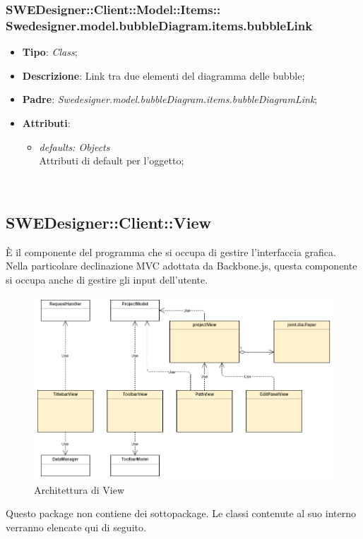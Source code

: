 \documentclass[../DefinizioneDiProdotto.tex]{subfiles}
\begin{document}
			\subsubsection[Swedesigner.model.bubbleDiagram.items.bubbleLink]{SWEDesigner::Client::Model::Items::\\Swedesigner.model.bubbleDiagram.items.bubbleLink}
			\hypertarget{SWEDesigner::Client::Model::Items::Swedesigner.model.bubbleDiagram.items.bubbleLink}{}
			\begin{itemize}
				\item \textbf{Tipo}: \emph{Class};
				\item \textbf{Descrizione}: Link tra due elementi del diagramma delle bubble;
				\item \textbf{Padre}: \emph{Swedesigner.model.bubbleDiagram.items.bubbleDiagramLink};
				\item \textbf{Attributi}:
				\begin{itemize}
					\item \emph{defaults: Objects}\\
					Attributi di default per l'oggetto;
				\end{itemize}\
			\end{itemize}
					
			\subsection{SWEDesigner::Client::View}
				\hypertarget{SWEDesigner::Client::View}{}
				È il componente del programma che si occupa di gestire l'interfaccia grafica. Nella particolare declinazione MVC adottata da Backbone.js, questa componente si occupa anche di gestire gli input dell'utente.
					\begin{figure}[H]\label{fig:View}
						\centering
						\includegraphics[scale=0.44]{Immagini/DiagrammaArchitettura/View.png}
						\caption{Architettura di View}
					\end{figure}
				Questo package non contiene dei sottopackage.
				Le classi contenute al suo interno verranno elencate qui di seguito.
\end{document}
